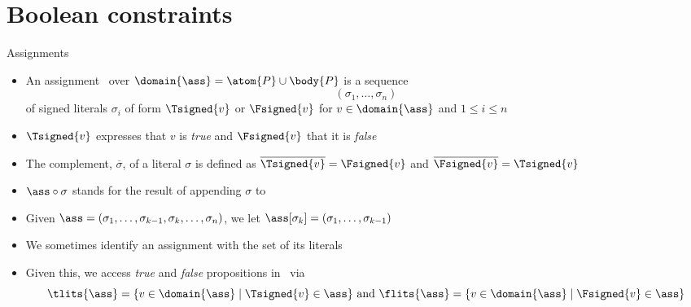 \section{Boolean constraints}
\begin{frame}{Assignments}
  \begin{itemize}
  \item<1-> An \alert{assignment} \ass\ over $\domain{\ass}=\atom{P}\cup\body{P}$
    is a sequence
    \[
    (\sigma_1,\ldots,\sigma_n)
    \]
    of \alert{signed literals}
    $\sigma_i$ of form \alert{$\Tsigned{v}$} or \alert{$\Fsigned{v}$} for
    $v\in\domain{\ass}$ and $1 \leq i \leq n$
  \item<1,7> $\Tsigned{v}$ expresses that $v$ is \emph{true} and $\Fsigned{v}$ that it is \emph{false}
  \item<2,7> The complement, $\overline{\sigma}$, of a literal $\sigma$ is defined as
    $\overline{\Tsigned{v}} = \Fsigned{v}$ and $\overline{\Fsigned{v}} = \Tsigned{v}$
  \item<3,7> $\ass\circ\sigma$ stands for the result of appending $\sigma$ to \ass
  \item<4,7> Given $\ass=(\sigma_1,\ldots,\sigma_{k-1},\sigma_k,\dots,\sigma_n)$,
        we let $\ass[\sigma_k]=(\sigma_1,\ldots,\sigma_{k-1})$
  \item<5,6,7> We sometimes identify an assignment with the set of its literals
  \item<6,7>
    Given this,
    we access \emph{true} and \emph{false} propositions in \ass\ via
    \[
    \tlits{\ass}
    =
    \{v \in \domain{\ass} \mid \Tsigned{v} \in\ass\}
    \text{ and }
    \flits{\ass}
    =
    \{v \in \domain{\ass} \mid \Fsigned{v} \in\ass\}
    \]
  \end{itemize}
\end{frame}
